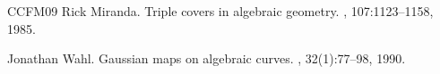 \documentclass[a4paper,12pt]{amsart}
\begin{document}
\begin{thebibliography}{CCFM09}
Rick Miranda.
\newblock Triple covers in algebraic geometry.
, 107:1123--1158, 1985.

Jonathan Wahl.
\newblock Gaussian maps on algebraic curves.
, 32(1):77--98, 1990.

\end{thebibliography}
\end{document}
